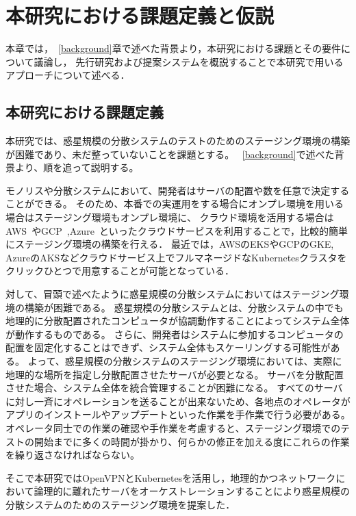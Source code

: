 \chapter{本研究における課題定義と仮説}
\label{issue}

本章では，~\ref{background}章で述べた背景より，本研究における課題とその要件について議論し，
先行研究および提案システムを概説することで本研究で用いるアプローチについて述べる．

\section{本研究における課題定義}
\label{issue:definition}

本研究では、惑星規模の分散システムのテストのためのステージング環境の構築が困難であり、未だ整っていないことを課題とする。
~\ref{background}で述べた背景より、順を追って説明する。

モノリスや分散システムにおいて、開発者はサーバの配置や数を任意で決定することができる。
そのため、本番での実運用をする場合にオンプレ環境を用いる場合はステージング環境もオンプレ環境に、
クラウド環境を活用する場合はAWS~\cite{AWS}やGCP~\cite{GCP},Azure~\cite{Azure}といったクラウドサービスを利用することで，比較的簡単にステージング環境の構築を行える．
最近では，AWSのEKSやGCPのGKE, AzureのAKSなどクラウドサービス上でフルマネージドなKubernetesクラスタをクリックひとつで用意することが可能となっている．

対して、冒頭で述べたように惑星規模の分散システムにおいてはステージング環境の構築が困難である。
惑星規模の分散システムとは、分散システムの中でも地理的に分散配置されたコンピュータが協調動作することによってシステム全体が動作するものである。
さらに、開発者はシステムに参加するコンピュータの配置を固定化することはできず、システム全体もスケーリングする可能性がある。
よって、惑星規模の分散システムのステージング環境においては、実際に地理的な場所を指定し分散配置させたサーバが必要となる。
サーバを分散配置させた場合、システム全体を統合管理することが困難になる。
すべてのサーバに対し一斉にオペレーションを送ることが出来ないため、各地点のオペレータがアプリのインストールやアップデートといった作業を手作業で行う必要がある。
オペレータ同士での作業の確認や手作業を考慮すると、ステージング環境でのテストの開始までに多くの時間が掛かり、何らかの修正を加える度にこれらの作業を繰り返さなければならない。

そこで本研究ではOpenVPNとKubernetesを活用し，地理的かつネットワークにおいて論理的に離れたサーバをオーケストレーションすることにより惑星規模の分散システムのためのステージング環境を提案した．

